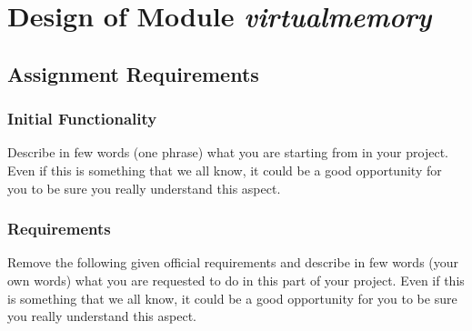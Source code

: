 
\chapter{Design of Module \textit{virtualmemory}}

\section{Assignment Requirements}


\subsection{Initial Functionality}

Describe in few words (one phrase) what you are starting from in your project. Even if this is something that we all know, it could be a good opportunity for you to be sure you really understand this aspect.


\subsection{Requirements}

Remove the following given official requirements and describe in few words (your own words) what you are requested to do in this part of your project. Even if this is something that we all know, it could be a good opportunity for you to be sure you really understand this aspect. 


